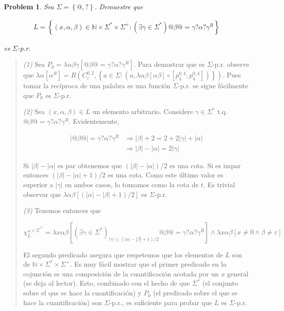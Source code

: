\documentclass[a4paper, 12pt]{article}
\newtheorem{problem}{Problem}
\newtheorem{problem}{Problem}
\begin{document}
\pagebreak


\begin{problem}
    Sea $\Sigma = \left\{ @, ? \right\} $. Demuestre que 

    \begin{align*}
        L = \left\{ (x, \alpha, \beta) \in \mathbb{N} \times \Sigma^{*}\times
        \Sigma^{+} : \left( \exists \gamma \in \Sigma^{*} \right)  @\beta@ = \gamma?\alpha ?\gamma^{R}\right\} 
    \end{align*}

    es $\Sigma$-p.r. 
\end{problem}


\small
\begin{quote}

\textit{(1)} Sea $P_0 = \lambda \alpha\beta\gamma\left[ @\beta@ =
\gamma?\alpha?\gamma^R  \right]$. Para demostrar que es $\Sigma$-p.r. observe
que $\lambda \alpha \left[  \alpha^R  \right] = R\left(C_{\varepsilon }^{0, 2},
\left\{ a \in \Sigma : \left( a, \lambda \alpha\beta \left[  \alpha\beta
\right] \circ \left[ p_3^{0, 4}, p_4^{0, 4} \right]  \right)  \right\}\right) $. Pues
tomar la recíproca de una palabra es una función $\Sigma$-p.r. se sigue
fácilmente que $P_0$ es $\Sigma$-p.r. 

\textit{(2)} Sea $\left( x, \alpha, \beta \right) \in  L $ un elemento
arbitrario. Considere $\gamma \in \Sigma^{*}$ t.q. $@\beta@ =
\gamma?\alpha?\gamma^{R}$. Evidentemente, 

\begin{align*}
    |@\beta @| = \gamma?\alpha?\gamma^{R} &\Rightarrow |\beta| + 2 = 2 + 2|\gamma|
    + |\alpha| \\ 
                                          &\Rightarrow |\beta| - |\alpha| =
                                          2|\gamma|
\end{align*}

Si $|\beta| - |\alpha|$ es par obtenemos que $(|\beta| - |\alpha|)/2$ es una
cota. Si es impar entonces $(|\beta| - |\alpha| + 1) / 2$ es una cota. Como este
último valor es superior a $|\gamma|$ en ambos casos, lo tomamos como la cota de
$t$. Es trivial observar que $\lambda \alpha\beta \left[ (|\alpha| - |\beta| +
1) / 2  \right]$ es $\Sigma$-p.r. 

\textit{(3)} Tenemos entonces que 

$$\chi_{L}^{\omega \times \Sigma^{*}^2} =
\lambda x \alpha \beta \left[ (\exists \gamma \in \Sigma^{*})_{|\gamma| \leq
\left( |\alpha| - |\beta| + 1 \right) / 2 } @\beta@ = \gamma?\alpha?\gamma^{R}
\right] \land \lambda x\alpha\beta \left[ x \neq 0 \land \beta \neq \varepsilon   \right]$$

El segundo predicado asegura que respetemos que los elementos de $L$ son de
$\mathbb{N} \times {\Sigma^{*}} \times \Sigma^{+}$. Es muy fácil mostrar que el
primer predicado en la cojunción es una composición de la cuantificación acotada
por un $x$ general (se deja al lector). Esto, combinado con el hecho de que
$\Sigma^{*}$ (el conjunto sobre el que se hace la cuantificación) y $P_0$ (el
predicado sobre el que se hace la cuantificación) son $\Sigma$-p.r., es
suficiente para probar que $L$ es $\Sigma$-p.r. 

\end{quote}
\end{document}
